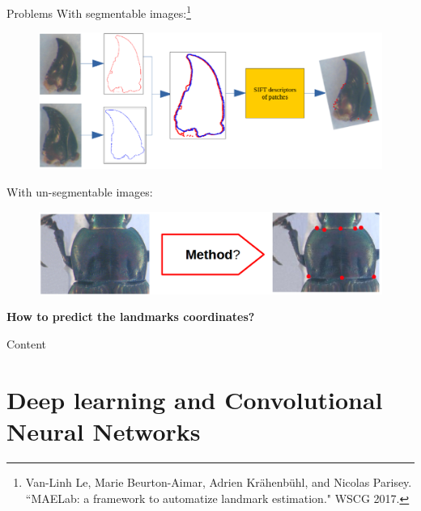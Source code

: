 \documentclass[10pt]{beamer}
\begin{document}
\begin{frame}{Problems}{}
  \small{With segmentable images:\footnote{\tiny{Van-Linh Le, Marie Beurton-Aimar, Adrien Krähenbühl, and Nicolas Parisey. ``MAELab: a framework to automatize landmark estimation." WSCG 2017.}}}
	\begin{figure}[htbp]
  		\centering
   	 	\includegraphics[scale=.18]{images/sift_method}
	\end{figure}
\pause
	\small{With un-segmentable images: }
  \begin{figure}[htbp]
        \centering
        \includegraphics[scale=.17]{images/method}
	\end{figure}
\pause	
	\textbf{\color{red}How to predict the landmarks coordinates?}
\end{frame}

\begin{frame}{Content}{}
\tableofcontents
\end{frame}

\section{Deep learning and Convolutional Neural Networks}
\end{document}
